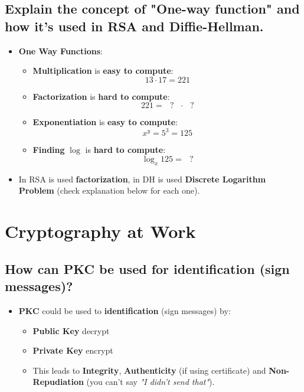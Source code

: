 \documentclass[9pt, letterpaper]{article}
\begin{document}
\subsection{Explain the concept of "One-way function" and how it's used in RSA and Diffie-Hellman.}
\begin{itemize}
	\item \textbf{One Way Functions}:
	\begin{itemize}
		\item \textbf{Multiplication} is \textbf{easy to compute}: $$ 13\cdot 17 = 221 $$
		\item \textbf{Factorization} is \textbf{hard to compute}: $$ 221 = \mbox{  } ? \mbox{ }\cdot \mbox{ } ? $$
		\item \textbf{Exponentiation} is \textbf{easy to compute}: $$ x^y = 5^3 = 125 $$
		\item \textbf{Finding} $\log$ is \textbf{hard to compute}: $$ \log_x125 = \mbox{ } ? $$
	\end{itemize}
	\item In RSA is used \textbf{factorization}, in \textsc{DH} is used \textbf{Discrete Logarithm Problem} (check explanation below for each one).
\end{itemize}

\newpage

\section{Cryptography at Work}

\subsection{How can PKC be used for identification (sign messages)?}
\begin{itemize}
	\item \textbf{PKC} could be used to \textbf{identification} (sign messages) by:
	\begin{itemize}
		\item \textbf{Public Key} decrypt
		\item \textbf{Private Key} encrypt
		\item This leads to \textbf{Integrity}, \textbf{Authenticity} (if using certificate) and \textbf{Non-Repudiation} (you can't say \textit{"I didn't send that"}).
	\end{itemize}
\end{itemize}
\end{document}
